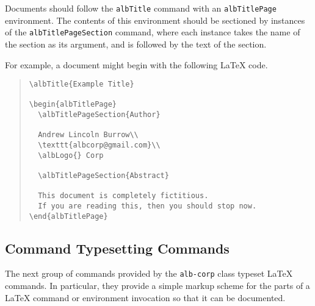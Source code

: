 \documentclass[11pt,a4paper,oneside,titlepage]{alb-corp}
\begin{document}
Documents should follow the \texttt{albTitle} command with an
\texttt{albTitlePage} environment.  The contents of this environment
should be sectioned by instances of the \texttt{albTitlePageSection}
command, where each instance takes the name of the section as its
argument, and is followed by the text of the section.

For example, a document might begin with the following \LaTeX{} code.
\begin{quote}
\begin{verbatim}
\albTitle{Example Title}

\begin{albTitlePage}
  \albTitlePageSection{Author}

  Andrew Lincoln Burrow\\
  \texttt{albcorp@gmail.com}\\
  \albLogo{} Corp

  \albTitlePageSection{Abstract}

  This document is completely fictitious.
  If you are reading this, then you should stop now.
\end{albTitlePage}
\end{verbatim}
\end{quote}



\subsection{Command Typesetting Commands}
\label{sec:alb-corp-layout-documentation:comm-types-comm}

The next group of commands provided by the \texttt{alb-corp} class
typeset \LaTeX{} commands.  In particular, they provide a simple markup
scheme for the parts of a \LaTeX{} command or environment invocation so
that it can be documented.
\end{document}
